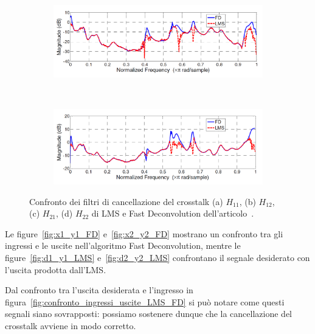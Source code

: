 \documentclass[12pt,a4paper,titlepage]{article}
\begin{document}
\begin{figure}[h]
	\ContinuedFloat
	\centering
	\begin{subfigure}{1\textwidth}
		\includegraphics[width=1\textwidth]{Immagini/H21_paper}
		\caption{}
		\label{fig:Confronto_H21_LMS_FD_paper}
	\end{subfigure}\\
	\begin{subfigure}{1\textwidth}
		\includegraphics[width=1\textwidth]{Immagini/H22_paper}
		\caption{}
		\label{fig:Confronto_H22_LMS_FD_paper}
	\end{subfigure}
	\caption{Confronto dei filtri di cancellazione del crosstalk (a) $H_{11}$, (b) $H_{12}$, (c) $H_{21}$, (d) $H_{22}$ di LMS e Fast Deconvolution dell'articolo~\cite{Li:comprehensive_comparison}.}
	\label{fig:confronto_H_LMS_FD_paper}
\end{figure}

Le figure~\ref{fig:x1_y1_FD} e~\ref{fig:x2_y2_FD} mostrano un confronto tra gli ingressi e le uscite nell'algoritmo Fast Deconvolution, mentre le figure~\ref{fig:d1_y1_LMS} e~\ref{fig:d2_y2_LMS} confrontano il segnale desiderato con l'uscita prodotta dall'LMS.

Dal confronto tra l'uscita desiderata e l'ingresso in figura~\ref{fig:confronto_ingressi_uscite_LMS_FD} si può notare come questi segnali siano sovrapposti: possiamo sostenere dunque che la cancellazione del crosstalk avviene in modo corretto.
\end{document}
